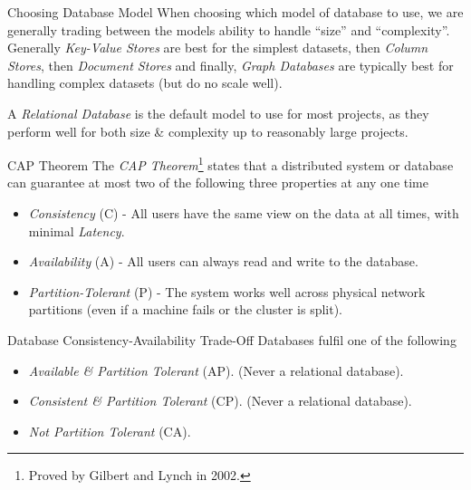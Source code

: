 \documentclass[11pt,a4paper]{article}
\begin{document}
  \begin{remark}{Choosing Database Model}
    When choosing which model of database to use, we are generally trading between the models ability to handle ``size'' and ``complexity''. Generally \textit{Key-Value Stores} are best for the simplest datasets, then \textit{Column Stores}, then \textit{Document Stores} and finally, \textit{Graph Databases} are typically best for handling complex datasets (but do no scale well).
    \par A \textit{Relational Database} is the default model to use for most projects, as they perform well for both size \& complexity up to reasonably large projects.
  \end{remark}

  \begin{theorem}{CAP Theorem}
    The \textit{CAP Theorem}\footnote{Proved by Gilbert and Lynch in 2002.} states that a distributed system or database can guarantee at most two of the following three properties at any one time
    \begin{itemize}
      \item \textit{Consistency} (C) - All users have the same view on the data at all times, with minimal \textit{Latency}.
      \item \textit{Availability} (A) - All users can always read and write to the database.
      \item \textit{Partition-Tolerant} (P) - The system works well across physical network partitions (even if a machine fails or the cluster is split).
    \end{itemize}
  \end{theorem}

  \begin{proposition}{Database Consistency-Availability Trade-Off}
    Databases fulfil one of the following
    \begin{itemize}
      \item \textit{Available \& Partition Tolerant} (AP). (Never a relational database).
      \item \textit{Consistent \& Partition Tolerant} (CP). (Never a relational database).
      \item \textit{Not Partition Tolerant} (CA).
    \end{itemize}
  \end{proposition}
\end{document}
